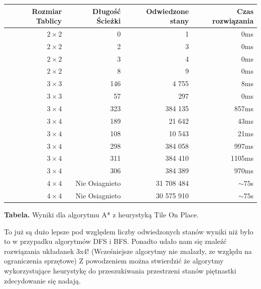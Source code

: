 \documentclass{classrep}
\begin{document}
\begin{center}
\begin{longtable}{|r|r|r|r|}
  \hline 
  Rozmiar Tablicy & Długość Ścieżki & Odwiedzone stany & Czas rozwiązania \\
	\hline
		$2 \times 2$ & 0 & 1 & 0ms \\
	\hline
		$2 \times 2$ & 2 & 3 & 0ms \\
	\hline
		$2 \times 2$ & 3 & 4 & 0ms \\
	\hline
		$2 \times 2$ & 8 & 9 & 0ms \\
	\hline
		$3 \times 3$ & 146 & 4 755 & 8ms \\
	\hline
		$3 \times 3$ & 57 & 297 & 0ms \\
	\hline
		$3 \times 4$ & 323 & 384 135 & 857ms \\
	\hline
		$3 \times 4$ & 189 & 21 642 & 43ms \\
	\hline
		$3 \times 4$ & 108 & 10 543 & 21ms \\
	\hline
		$3 \times 4$ & 298 & 384 058 & 997ms \\
	\hline
		$3 \times 4$ & 311 & 384 410 & 1105ms \\
	\hline
		$3 \times 4$ & 306 & 384 389 & 970ms \\
	\hline
		$4 \times 4$ & Nie Osiagnieto & 31 708 484 & $\sim 75$s \\
	\hline
		$4 \times 4$ & Nie Osiagnieto & 30 575 910 & $\sim 75$s \\
	\hline
\end{longtable} 
\textbf{Tabela.} Wyniki dla algorytmu A* z heurystyką Tile On Place.
\end{center}
To już są dużo lepsze pod względem liczby odwiedzonych stanów wyniki niż było to w przypadku algorytmów DFS i BFS. Ponadto udało nam się znaleźć rozwiązania układanek 3x4! (Wcześniejsze algorytmy nie znalazły, ze względu na ograniczenia sprzętowe) Z powodzeniem można stwierdzić że algorytmy wykorzystujące heurystykę do przeszukiwania przestrzeni stanów piętnastki zdecydowanie się nadają.
\end{document}
